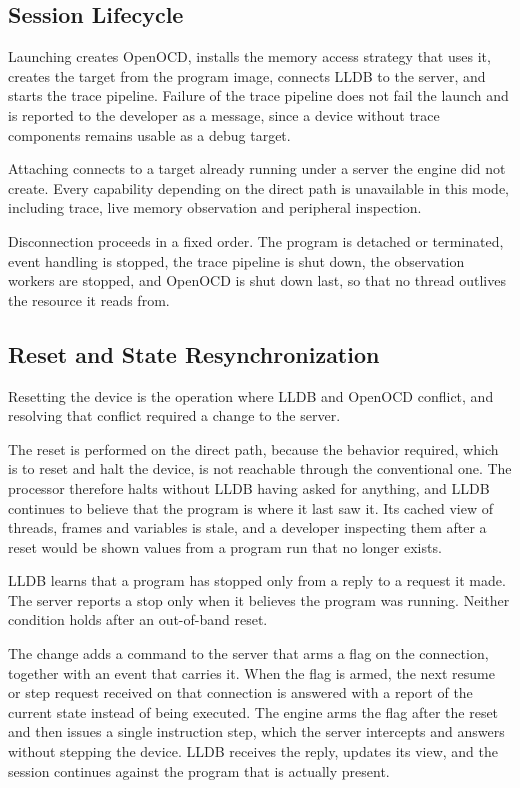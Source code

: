 \subsection{Session Lifecycle}
Launching creates OpenOCD, installs the memory access strategy that uses it, creates the target from the program image, connects LLDB to the server, and starts the trace pipeline. Failure of the trace pipeline does not fail the launch and is reported to the developer as a message, since a device without trace components remains usable as a debug target.

Attaching connects to a target already running under a server the engine did not create. Every capability depending on the direct path is unavailable in this mode, including trace, live memory observation and peripheral inspection.

Disconnection proceeds in a fixed order. The program is detached or terminated, event handling is stopped, the trace pipeline is shut down, the observation workers are stopped, and OpenOCD is shut down last, so that no thread outlives the resource it reads from.


\subsection{Reset and State Resynchronization}
\label{subsec:reset_impl}
Resetting the device is the operation where LLDB and OpenOCD conflict, and resolving that conflict required a change to the server.

The reset is performed on the direct path, because the behavior required, which is to reset and halt the device, is not reachable through the conventional one. The processor therefore halts without LLDB having asked for anything, and LLDB continues to believe that the program is where it last saw it. Its cached view of threads, frames and variables is stale, and a developer inspecting them after a reset would be shown values from a program run that no longer exists.

LLDB learns that a program has stopped only from a reply to a request it made. The server reports a stop only when it believes the program was running. Neither condition holds after an out-of-band reset.

The change adds a command to the server that arms a flag on the connection, together with an event that carries it. When the flag is armed, the next resume or step request received on that connection is answered with a report of the current state instead of being executed. The engine arms the flag after the reset and then issues a single instruction step, which the server intercepts and answers without stepping the device. LLDB receives the reply, updates its view, and the session continues against the program that is actually present.

